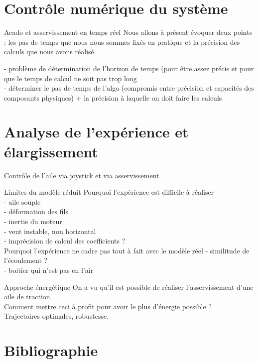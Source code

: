 \documentclass[a4paper,12pt]{article}
\newcounter{partie}
\newcounter{sous-partie}
\newenvironment{partie}[1]
{
\section{#1}
}
{

}
\newenvironment{biblio}
{
\section*{Bibliographie}
\addcontentsline{toc}{section}{Bibliographie}
}
{

}
\newenvironment{sous-partie}[1]
{
\subsection{#1}
}
{

}
\begin{document}
\begin{partie}{Contrôle numérique du système}
\begin{sous-partie}{Acado et asservissement en temps réel}
Nous allons à présent évoquer deux points : les pas de temps que nous nous sommes fixés en pratique et la précision des calculs que nous avons réalisé.


- problème de détermination de l'horizon de temps (pour être assez précis et pour que le temps de calcul ne soit pas trop long
\\
- déterminer le pas de temps de l'algo (compromis entre précision et capacités des composants physiques) + la précision à laquelle on doit faire les calculs
\end{sous-partie}


\end{partie}

\newpage

\begin{partie}{Analyse de l'expérience et élargissement}

\begin{sous-partie}{Contrôle de l'aile via joystick et via asservissement}

\end{sous-partie}

\begin{sous-partie}{Limites du modèle réduit }
Pourquoi l'expérience est difficile à réaliser
\\
- aile souple
\\
- déformation des fils
\\
- inertie du moteur
\\
- vent instable, non horizontal
\\
- imprécision de calcul des coefficients ?
\\
Pourquoi l'expérience ne cadre pas tout à fait avec le modèle réel
- similitude de l'écoulement ?
\\
- boitier qui n'est pas en l'air
\end{sous-partie}

\begin{sous-partie}{Approche énergétique}
On a vu qu'il est possible de réaliser  l'asservissement d'une aile de traction.
\\
Comment mettre ceci à profit pour avoir le plus d'énergie possible ?
\\
Trajectoires optimales, robustesse.
\end{sous-partie}

\end{partie}

\newpage

\begin{biblio}

\end{biblio}
\end{document}
